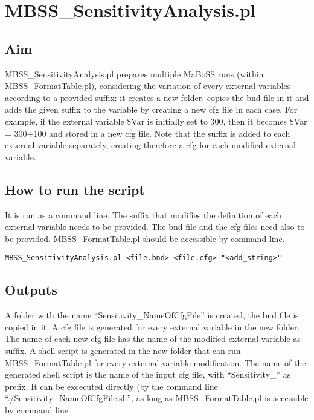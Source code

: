 \documentclass{article}
\begin{document}
\section*{MBSS\_SensitivityAnalysis.pl}

\subsection*{Aim}
MBSS\_SensitivityAnalysis.pl prepares multiple MaBoSS runs (within MBSS\_FormatTable.pl), considering the variation of every external variables according to a provided suffix: it creates a new folder, copies the bnd file in it and adds the given suffix to the variable by creating a new cfg file in each case. For example, if the external variable \$Var is initially set to 300, then it becomes \$Var = 300+100 and stored in a new cfg file. Note that the suffix is added to each external variable separately, creating therefore a cfg for each modified external variable.

\subsection*{How to run the script}
It is run as a command line. The suffix that modifies the definition of each external variable needs to be provided. The bnd file and the cfg files need also to be provided. MBSS\_FormatTable.pl should be accessible by command line.

\begin{verbatim}
MBSS_SensitivityAnalysis.pl <file.bnd> <file.cfg> "<add_string>"
\end{verbatim}

\subsection*{Outputs}
A folder with the name ``Sensitivity\_NameOfCfgFile'' is created, the bnd file is copied in it.
A cfg file is generated for every external variable in the new folder. The name of each new cfg file has the name of the modified external variable as suffix.
A shell script is generated in the new folder that can run MBSS\_FormatTable.pl for every external variable modification. The name of the generated shell script is the name of the input cfg file, with ``Sensitivity\_'' as prefix. It can be excecuted directly (by the command line ``./Sensitivity\_NameOfCfgFile.sh'', as long as MBSS\_FormatTable.pl is accessible by command line.
\end{document}
